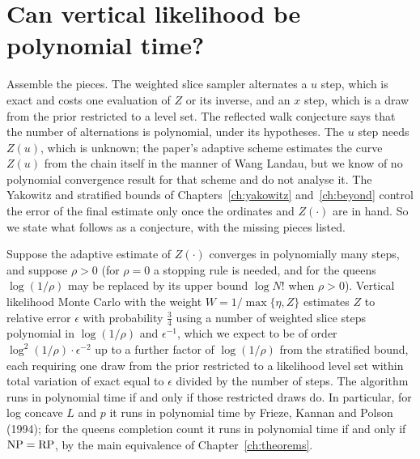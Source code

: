 \section{Can vertical likelihood be polynomial time?}

Assemble the pieces. The weighted slice sampler alternates a $u$ step, which is exact and costs one evaluation of $Z$ or its inverse, and an $x$ step, which is a draw from the prior restricted to a level set. The reflected walk conjecture says that the number of alternations is polynomial, under its hypotheses. The $u$ step needs $Z(u)$, which is unknown; the paper's adaptive scheme estimates the curve $Z(u)$ from the chain itself in the manner of Wang Landau, but we know of no polynomial convergence result for that scheme and do not analyse it. The Yakowitz and stratified bounds of Chapters~\ref{ch:yakowitz} and~\ref{ch:beyond} control the error of the final estimate only once the ordinates and $Z(\cdot)$ are in hand. So we state what follows as a conjecture, with the missing pieces listed.

\begin{conjecture}
\label{conj:vlpoly}
Suppose the adaptive estimate of $Z(\cdot)$ converges in polynomially many steps, and suppose $\rho > 0$ (for $\rho = 0$ a stopping rule is needed, and for the queens $\log(1/\rho)$ may be replaced by its upper bound $\log N!$ when $\rho > 0$). Vertical likelihood Monte Carlo with the weight $W = 1/\max\{\eta, Z\}$ estimates $Z$ to relative error $\epsilon$ with probability $\tfrac34$ using a number of weighted slice steps polynomial in $\log(1/\rho)$ and $\epsilon^{-1}$, which we expect to be of order $\log^2(1/\rho) \cdot \epsilon^{-2}$ up to a further factor of $\log(1/\rho)$ from the stratified bound, each requiring one draw from the prior restricted to a likelihood level set within total variation of exact equal to $\epsilon$ divided by the number of steps. The algorithm runs in polynomial time if and only if those restricted draws do. In particular, for log concave $L$ and $p$ it runs in polynomial time by Frieze, Kannan and Polson (1994); for the queens completion count it runs in polynomial time if and only if $\mathrm{NP} = \mathrm{RP}$, by the main equivalence of Chapter~\ref{ch:theorems}.
\end{conjecture}

